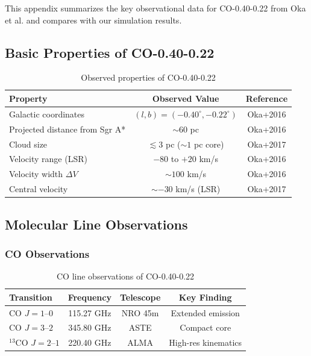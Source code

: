 \documentclass[twocolumn,amsmath,amssymb,prd,superscriptaddress,nofootinbib]{revtex4-2}
\begin{document}
This appendix summarizes the key observational data for CO-0.40-0.22 from Oka et al. \cite{Oka2016,Oka2017} and compares with our simulation results.

\subsection{Basic Properties of CO-0.40-0.22}

\begin{table}[h]
\centering
\caption{Observed properties of CO-0.40-0.22 \cite{Oka2016,Oka2017}}
\label{tab:oka_obs}
\begin{tabular}{lcc}
\toprule
Property & Observed Value & Reference \\
\midrule
Galactic coordinates & $(l, b) = (-0.40^\circ, -0.22^\circ)$ & Oka+2016 \\
Projected distance from Sgr A* & $\sim 60$ pc & Oka+2016 \\
Cloud size & $\lesssim 3$ pc ($\sim 1$ pc core) & Oka+2017 \\
Velocity range (LSR) & $-80$ to $+20$ km/s & Oka+2016 \\
Velocity width $\Delta V$ & $\sim 100$ km/s & Oka+2016 \\
Central velocity & $\sim -30$ km/s (LSR) & Oka+2017 \\
\bottomrule
\end{tabular}
\end{table}

\subsection{Molecular Line Observations}

\subsubsection{CO Observations}

\begin{table}[h]
\centering
\caption{CO line observations of CO-0.40-0.22}
\label{tab:co_obs}
\begin{tabular}{lccc}
\toprule
Transition & Frequency & Telescope & Key Finding \\
\midrule
CO $J=1\text{--}0$ & 115.27 GHz & NRO 45m & Extended emission \\
CO $J=3\text{--}2$ & 345.80 GHz & ASTE & Compact core \\
$^{13}$CO $J=2\text{--}1$ & 220.40 GHz & ALMA & High-res kinematics \\
\bottomrule
\end{tabular}
\end{table}
\end{document}
